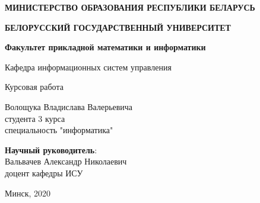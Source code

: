 \begin{titlepage}
    \begin{center}
         \textbf{МИНИСТЕРСТВО ОБРАЗОВАНИЯ РЕСПУБЛИКИ БЕЛАРУСЬ}
    \end{center}
    \begin{center}
         \textbf{БЕЛОРУССКИЙ ГОСУДАРСТВЕННЫЙ УНИВЕРСИТЕТ}
    \end{center}
    \begin{center}
         \textbf{Факультет прикладной математики и информатики}
    \end{center}
    \begin{center}
        Кафедра информационных систем управления
    \end{center}

    \vspace{9em}

    \begin{center}
        \textbf{\@jobtitle}
    \end{center}

    \vspace{2em}

    \begin{center}
        Курсовая работа
    \end{center}

    \vspace{4em}

    \begin{flushright}
        Волощука Владислава Валерьевича\\
        студента 3 курса\\
        специальность "информатика"\\
    \end{flushright}

    \vspace{1em}

    \begin{flushright}
         \textbf{Научный руководитель}:\\
        Вальвачев Александр Николаевич\\
        доцент кафедры ИСУ\\
    \end{flushright}

    \vfill

    \begin{center}
        Минск, 2020
    \end{center}
\end{titlepage}
\newpage
